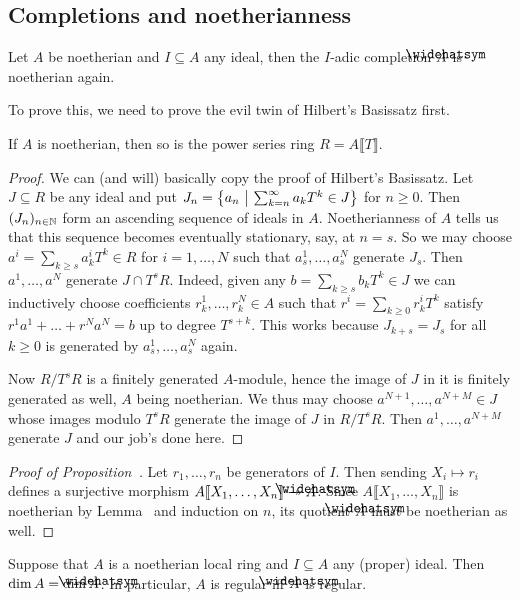 \documentclass[a4paper,parskip=half,numbers=enddot, DIV=12]{scrreprt}
\renewcommand{\geq}{\geqslant}
\begin{document}
\subsection{Completions and noetherianness}
\begin{prop}
	Let $A$ be noetherian and $I\subseteq A$ any ideal, then the $I$-adic completion $\roof{A}$ is noetherian again.
\end{prop}
To prove this, we need to prove the evil twin of Hilbert's Basissatz first.
\begin{lem}
	If $A$ is noetherian, then so is the power series ring $R=A\llbracket T\rrbracket$.
\end{lem}
\begin{proof}
	We can (and will) basically copy the proof of Hilbert's Basissatz. Let $J\subseteq R$ be any ideal and put $J_n=\left\{a_n\ \middle|\  \sum_{k=n}^\infty a_kT^k\in J\right\}$ for $n\geq 0$. Then $(J_n)_{n\in \mathbb{N}}$ form an ascending sequence of ideals in $A$. Noetherianness of $A$ tells us that this sequence becomes eventually stationary, say, at $n=s$. So we may choose $a^i=\sum_{k\geq s}a_k^iT^k\in R$ for $i=1,\ldots,N$ such that $a_s^1,\ldots,a_s^N$ generate $J_s$. Then $a^1,\ldots,a^N$ generate $J\cap T^sR$. Indeed, given any $b=\sum_{k\geq s}b_kT^k\in J$ we can inductively choose coefficients $r_k^1,\ldots,r_k^N\in A$ such that $r^i=\sum_{k\geq 0}r_k^iT^k$ satisfy $r^1a^1+\ldots+r^Na^N=b$ up to degree $T^{s+k}$. This works because $J_{k+s}=J_s$ for all $k\geq 0$ is generated by $a_s^1,\ldots,a_s^N$ again.
	
	Now $R/T^sR$ is a finitely generated $A$-module, hence the image of $J$ in it is finitely generated as well, $A$ being noetherian. We thus may choose $a^{N+1},\ldots,a^{N+M}\in J$ whose images modulo $T^sR$ generate the image of $J$ in $R/T^sR$. Then $a^{1},\ldots,a^{N+M}$ generate $J$ and our job's done here.
\end{proof}
\begin{proof}[Proof of Proposition~]
	Let $r_1,\ldots,r_n$ be generators of $I$. Then sending $X_i\mapsto r_i$ defines a surjective morphism $A\llbracket X_1,\ldots,X_n\rrbracket\epimorphism \roof{A}$. Since $A\llbracket X_1,\ldots,X_n\rrbracket$ is noetherian by Lemma~ and induction on $n$, its quotient $\roof{A}$ must be noetherian as well.
\end{proof}
\begin{cor}
	Suppose that $A$ is a noetherian local ring and $I\subseteq A$ any (proper) ideal. Then $\dim A=\dim\roof{A}$. In particular, $A$ is regular iff $\roof{A}$ is regular.
\end{cor}
\end{document}
